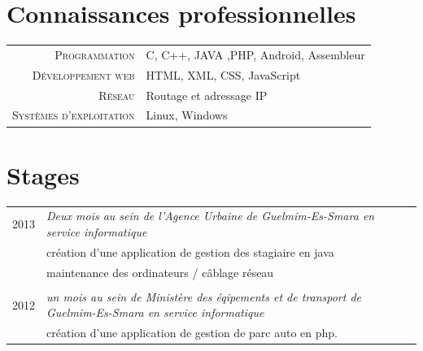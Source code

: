 \documentclass[a4paper,10pt]{article} %
\begin{document}

\section{Connaissances professionnelles}

\begin{tabular}{rl}
\textsc{Programmation} & C, C++, JAVA ,PHP, Android, Assembleur \\

\textsc{Développement web} & HTML, XML, CSS, JavaScript \\

\textsc{Réseau} & Routage et adressage IP \\
\textsc{Systèmes d'exploitation} & Linux, Windows \\ 
\end{tabular}





\section{Stages}

\begin{tabular}{r|p{11cm}}

\textsc{ 2013} & \emph{Deux mois au sein de l'Agence Urbaine de Guelmim-Es-Smara en service informatique}\\ 
& \footnotesize{création d'une application de gestion des stagiaire en java} \\
& \footnotesize{maintenance des ordinateurs / câblage réseau} \\
\multicolumn{2}{c}{} \\


\textsc{ 2012} & \emph{un mois au sein de Ministère des éqipements et de transport de Guelmim-Es-Smara en service informatique}\\ 
& \footnotesize{création d'une application de gestion de parc auto en php}.
\end{tabular}
\end{document}
